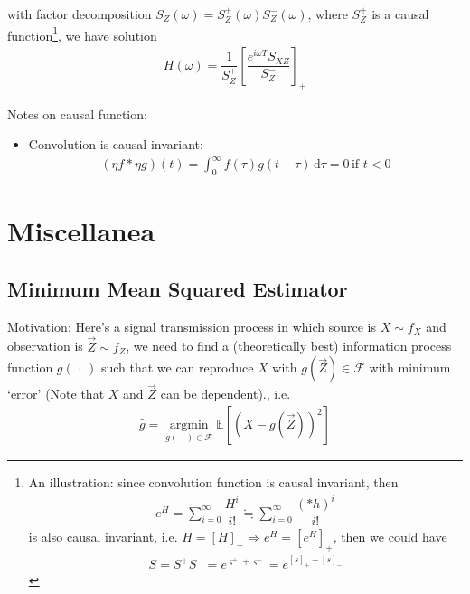 with factor decomposition $ S_Z(\omega )=S_Z^+(\omega )S_Z^-(\omega ) $, where $ S_Z^+ $ is a causal function\footnote{An illustration: since convolution function is causal invariant, then
\begin{align*}
    e^H=\sum_{i=0}^\infty \dfrac{H^i}{i!}\fallingdotseq \sum_{i=0}^\infty \dfrac{(* h)^i}{i!} 
\end{align*}
is also causal invariant, i.e. $ H=[H]_+\Rightarrow e^H=[e^H]_+ $, then we could have
\begin{align*}
    S=S^+S^-=e^{\varsigma^++\varsigma^-}=e^{[s]_++[s]_-}
\end{align*}
}, we have solution
\begin{align*}
    H(\omega )=\dfrac{1}{S_Z^+}\left[\dfrac{e^{i\omega T}S_{XZ}}{S_Z^-}\right]_+ 
\end{align*}


Notes on causal function:
\begin{itemize}[topsep=2pt,itemsep=0pt]
    \item Convolution is causal invariant:
    \begin{align*}
        (\eta f * \eta g)(t) = \int_0^\infty f(\tau)g(t-\tau) \,\mathrm{d}\tau = 0 \,\text{if }t<0
    \end{align*}
\end{itemize}

    










\section{Miscellanea}

\subsection{Minimum Mean Squared Estimator}\label{SubSecMMSE}
    Motivation: Here's a signal transmission process in which source is $ X\sim f_{X} $ and observation is $ \vec{Z}\sim f_Z $, we need to find a (theoretically best) information process function $ g(\, \cdot \, ) $ such that we can reproduce $ X $ with $ g(\vec{Z})\in\mathscr{F} $ with minimum `error' (Note that $ X$ and $\vec{Z} $ can be dependent)., i.e.
    \begin{align}
        \hat{g}=\mathop{\arg\min}\limits_{g(\, \cdot \, )\in \mathscr{F}} \mathbb{E}\left[ (X-g(\vec{Z}))^2 \right] 
    \end{align}

